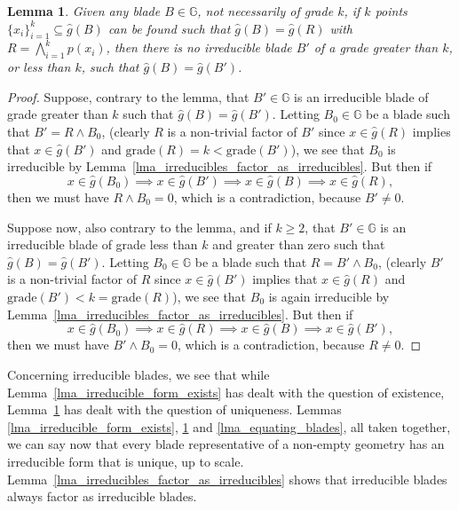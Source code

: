 \documentclass{birkjour}
\newtheorem{lem}[thm]{Lemma}
\theoremstyle{definition}
\theoremstyle{remark}
\numberwithin{equation}{section}
\newcommand{\G}{\mathbb{G}}
\newcommand{\gh}{\hat{g}}
\newcommand{\grade}{\mbox{grade}}
\begin{document}
\begin{lem}\label{lma_unique_grade_of_irreducible_form}
Given any blade $B\in\G$, not necessarily of grade $k$,
if $k$ points $\{x_i\}_{i=1}^k\subseteq\gh(B)$ can be found
such that $\gh(B)=\gh(R)$ with $R=\bigwedge_{i=1}^k p(x_i)$, then there is no
irreducible blade $B'$ of a grade greater than $k$, or less than $k$, such that $\gh(B)=\gh(B')$.
\end{lem}
\begin{proof}
Suppose, contrary to the lemma, that $B'\in\G$ is an irreducible blade of grade greater than $k$ such that $\gh(B)=\gh(B')$.
Letting $B_0\in\G$ be a blade such that $B'=R\wedge B_0$, (clearly $R$ is a non-trivial factor of $B'$ since $x\in\gh(R)$ implies
that $x\in\gh(B')$ and $\grade(R)=k<\grade(B')$), we see that $B_0$ is irreducible
by Lemma~\ref{lma_irreducibles_factor_as_irreducibles}.  But then if
\begin{equation*}
x\in\gh(B_0)\implies x\in\gh(B')\implies x\in\gh(B)\implies x\in\gh(R),
\end{equation*}
then we must have $R\wedge B_0=0$, which is a contradiction, because $B'\neq 0$.

Suppose now, also contrary to the lemma, and if $k\geq 2$, that $B'\in\G$ is an irreducible blade of grade less than $k$ and
greater than zero such that $\gh(B)=\gh(B')$.
Letting $B_0\in\G$ be a blade such that $R=B'\wedge B_0$, (clearly $B'$ is a non-trivial factor of $R$ since $x\in\gh(B')$ implies
that $x\in\gh(R)$ and $\grade(B')<k=\grade(R)$), we see that $B_0$ is again irreducible
by Lemma~\ref{lma_irreducibles_factor_as_irreducibles}.  But then if
\begin{equation*}
x\in\gh(B_0)\implies x\in\gh(R)\implies x\in\gh(B)\implies x\in\gh(B'),
\end{equation*}
then we must have $B'\wedge B_0=0$, which is a contradiction, because $R\neq 0$.
\end{proof}

Concerning irreducible blades, we see that while Lemma~\ref{lma_irreducible_form_exists} has dealt with
the question of existence, Lemma~\ref{lma_unique_grade_of_irreducible_form} has dealt with the question of uniqueness.  Lemmas \ref{lma_irreducible_form_exists}, \ref{lma_unique_grade_of_irreducible_form}
and \ref{lma_equating_blades}, all taken together, we can
say now that every blade representative of a non-empty geometry has an irreducible form that
is unique, up to scale.
Lemma~\ref{lma_irreducibles_factor_as_irreducibles} shows that irreducible blades always factor
as irreducible blades.
\end{document}
